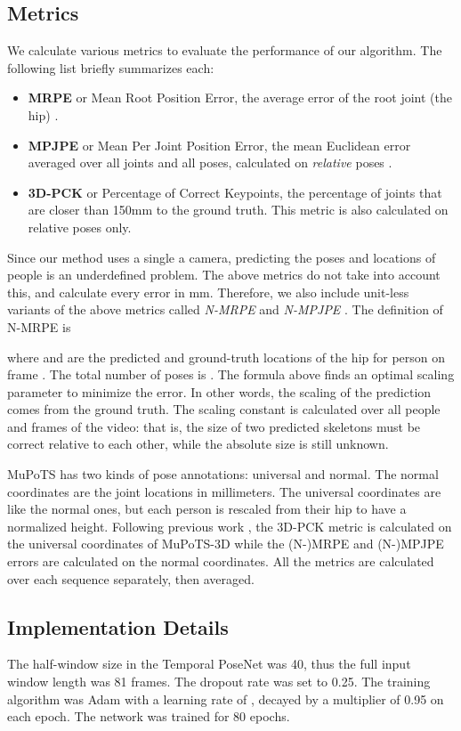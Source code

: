 \documentclass[runningheads, envcountsame, a4paper]{llncs}
\begin{document}
\subsection{Metrics}
We calculate various metrics to evaluate the performance of our algorithm. The following list briefly summarizes each:
\begin{itemize}
  \item \textbf{MRPE} or Mean Root Position Error, the average error of the root joint (the hip) \cite{moon2019camdistance}. \item \textbf{MPJPE} or Mean Per Joint Position Error, the mean Euclidean error averaged over all joints and  all poses, calculated on \textit{relative} poses \cite{3dbaseline}.
  \item \textbf{3D-PCK} or Percentage of Correct Keypoints, the percentage of joints that are closer than 150mm to the ground truth. This metric is also calculated on relative poses only.
\end{itemize}
Since our method uses a single a camera, predicting the poses and locations of people is an underdefined problem. The above metrics do not take into account this, and calculate every error in mm. Therefore, we also include unit-less variants of the above metrics called \textit{N-MRPE} and \textit{N-MPJPE} \cite{rhodinSkiing}. The definition of N\nobreakdash-MRPE is 

where  and  are the predicted and ground-truth locations of the hip for person  on  frame . The total number of poses is . The formula above finds an optimal scaling parameter  to minimize the error. In other words, the scaling of the prediction comes from the ground truth. The scaling constant  is calculated over all people and frames of the video: that is, the size of two predicted skeletons must be correct relative to each other, while the absolute size is still unknown.

MuPoTS has two kinds of pose annotations: universal and normal. The normal coordinates are the joint locations in millimeters. The universal coordinates are like the normal ones, but each person is rescaled from their hip to have a normalized height. Following previous work \cite{moon2019camdistance,veges2020wdspose}, the 3D\nobreakdash-PCK metric is calculated on the universal coordinates of MuPoTS\nobreakdash-3D while the (N-)MRPE and (N-)MPJPE errors are calculated on the normal coordinates. All the metrics are calculated over each sequence separately, then averaged.

\subsection{Implementation Details} \label{sec:imp-details}
The half-window size  in the Temporal PoseNet was 40, thus the full input window length was 81 frames. The dropout rate was set to 0.25. The training algorithm was Adam with a learning rate of , decayed by a multiplier of 0.95 on each epoch. The network was trained for 80 epochs.
\end{document}

